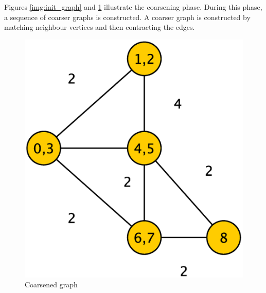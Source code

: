\documentclass[abstract=on,9pt,twocolumn]{scrartcl}
\begin{document}
Figures \ref{img:init_graph} and \ref{img:coarse_graph} illustrate the coarsening phase. During this phase, a sequence of coarser graphs is constructed.\cite{Karypis95parallelmultilevel} A coarser graph is constructed by matching neighbour vertices and then contracting the edges.

\begin{center}
  \begin{figure}[htb]
    \includegraphics[width=\columnwidth]{img/coarsening2.eps}
    \caption{Coarsened graph}
    \label{img:coarse_graph}
  \end{figure}
\end{center}
\end{document}
